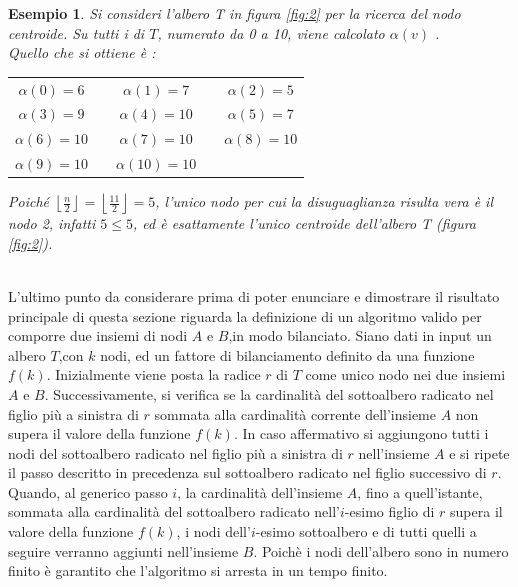 \newtheorem{esempio}[definizione]{Esempio}
\begin{esempio}
	\label{es1}
Si consideri l'albero T in figura \ref{fig:2} per la ricerca del nodo centroide.
Su tutti i di $ T $, numerato da 0 a 10,  viene calcolato $\alpha(v)$ . \\
Quello che si ottiene \`e :



\begin{center}
	\begin{tabular}{ c c c c c  }
		$\alpha(0) = 6$ & & $\alpha(1) = 7$ & & $\alpha(2) = 5$ \\ 
		$\alpha(3) = 9$ && $\alpha(4) = 10$ &&  $\alpha(5) =  7$ \\  
		$\alpha(6) = 10$ && $\alpha(7) = 10$ && $\alpha(8) = 10$ \\
		$\alpha(9) = 10$ && $\alpha(10) = 10$ &&
	\end{tabular}
\end{center}

Poich\'e $ \left\lfloor\frac{n}{2} \right\rfloor = \left\lfloor \frac{11}{2} \right\rfloor = 5$, l'unico nodo per cui la disuguaglianza risulta vera \`e il nodo 2, infatti $5\le 5$, ed \`e esattamente l'unico centroide dell'albero T (figura \ref{fig:2}). 
\demo
\end{esempio}\mbox{}\\

L'ultimo punto da considerare prima di poter enunciare e dimostrare il risultato principale di questa sezione riguarda la definizione di un algoritmo valido per comporre due insiemi di nodi $ A $ e $ B $,in modo bilanciato.
Siano dati in input un albero $ T $,con $ k $ nodi, ed un fattore di bilanciamento definito da una funzione $ f(k) $.
Inizialmente viene posta la radice $ r $ di $ T $ come unico nodo nei due insiemi $ A $ e $ B $.
Successivamente, si verifica se la cardinalit\`a del sottoalbero radicato nel figlio pi\`u a sinistra di $ r $ sommata alla cardinalit\`a corrente dell'insieme $ A $ non supera il valore della funzione $ f(k) $.
In caso affermativo si aggiungono tutti i nodi del sottoalbero radicato nel figlio pi\`u a sinistra di $ r $ nell'insieme $ A $ e si ripete il passo descritto in precedenza sul sottoalbero radicato nel figlio successivo di $ r $.
Quando, al generico passo $ i $, la cardinalit\`a dell'insieme $ A $, fino a quell'istante, sommata alla cardinalit\`a del sottoalbero radicato nell'$ i$-esimo figlio di $ r $ supera il valore della funzione $ f(k) $, i nodi dell'$ i$-esimo sottoalbero e di tutti quelli a seguire verranno aggiunti nell'insieme $ B $.
Poich\`e i nodi dell'albero sono in numero finito \`e garantito che l'algoritmo si arresta in un tempo finito.\\


